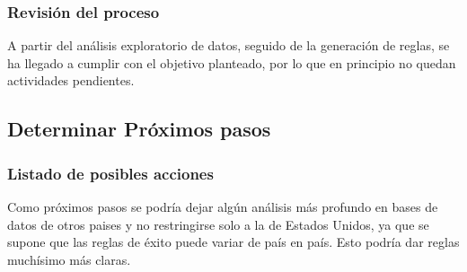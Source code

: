     \subsubsection{Revisión del proceso}

        A partir del análisis exploratorio de datos, seguido de la generación
        de reglas, se ha llegado a cumplir con el objetivo planteado, por lo
        que en principio no quedan actividades pendientes.

\subsection{Determinar Próximos pasos}
    \subsubsection{Listado de posibles acciones}

        Como próximos pasos se podría dejar algún análisis más profundo en
        bases de datos de otros paises y no restringirse solo a la de Estados
        Unidos, ya que se supone que las reglas de éxito puede variar de país
        en país. Esto podría dar reglas muchísimo más claras.